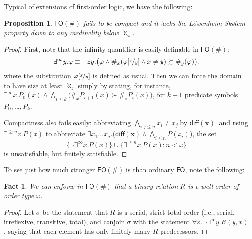 \documentclass[12pt,oneside,reqno]{amsart}
\newtheorem{fact}{Fact}
\newtheorem{proposition}{Proposition}
\theoremstyle{definition}
\begin{document}
Typical of extensions of first-order logic,  we have the following:
\begin{proposition} \label{prop:compactness}
$\mathsf{FO}(\#)$ fails to be compact and it lacks the L\"{o}wenheim-Sk\o lem property down to any cardinality below $\aleph_{\omega}$.
\end{proposition}
\begin{proof} First, note that the infinity quantifier is easily definable in $\mathsf{FO}(\#)$: \begin{eqnarray}
  \exists^\infty y.\varphi & \equiv & \exists y. \big(\varphi \wedge \#_x(\varphi[\nicefrac{x}{y}] \wedge x\neq y) \succsim \#_y(\varphi) \big),  \label{infinity-quantifier}
\end{eqnarray} %
where the substitution $\varphi[\nicefrac{x}{y}]$ is defined as usual. 
Then we can force the domain to have size at least $\aleph_k$ simply by stating, for instance, $\exists^\infty x. P_0(x) \wedge \bigwedge_{i \leq k}\big(\#_x P_{i+1}(x) \succ \#_x P_i(x)\big)$, for $k+1$ predicate symbols $P_0,\dots,P_k$.

Compactness also fails easily: abbreviating $\bigwedge_{i,j \leq n} x_i\neq x_j$ by $\mathsf{diff}(\mathbf{x})$, and using $\exists^{\geq n}x.P(x)$ to abbreviate $\exists x_1\dots x_{n}.\big(\mathsf{diff}(\mathbf{x}) \wedge \bigwedge_{i \leq n} P(x_i) \big)$, %
the set \begin{equation} \{\neg \exists^\infty x. P(x)\} \cup \{ \exists^{\geq n}x.P(x): n < \omega \}
    \label{incompact}
\end{equation} is unsatisfiable, but finitely satisfiable. \end{proof}


To see just how much stronger $\mathsf{FO}(\#)$ is than ordinary $\mathsf{FO}$, note the following:
\begin{fact} We can enforce in $\mathsf{FO}(\#)$ that a binary relation $R$ is a well-order of order type $\omega$. \label{ordertype}
\end{fact}
\begin{proof} Let $\sigma$ be the statement that $R$ is a serial, strict total order (i.e., serial, irreflexive, transitive, total), and conjoin $\sigma$ with the statement $\forall x. \neg \exists^{\infty} y. R(y,x)$, saying that each element has only finitely many $R$-predecessors. %
\end{proof}
\end{document}
